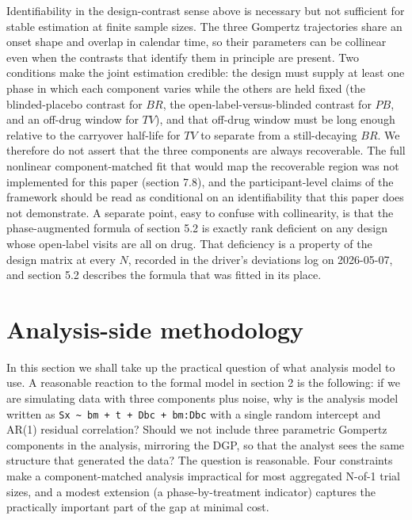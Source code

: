 \documentclass[
  11pt,
]{article}
\begin{document}
Identifiability in the design-contrast sense above is necessary but not
sufficient for stable estimation at finite sample sizes. The three Gompertz
trajectories share an onset shape and overlap in calendar time, so their
parameters can be collinear even when the contrasts that identify them in
principle are present. Two conditions make the joint estimation credible: the
design must supply at least one phase in which each component varies while the
others are held fixed (the blinded-placebo contrast for \(BR\), the
open-label-versus-blinded contrast for \(PB\), and an off-drug window for \(TV\)),
and that off-drug window must be long enough relative to the carryover
half-life for \(TV\) to separate from a still-decaying \(BR\). We therefore do
not assert that the three components are always recoverable. The full
nonlinear component-matched fit that would map the recoverable region was
not implemented for this paper (section 7.8), and the participant-level
claims of the framework should be read as conditional on an
identifiability that this paper does not demonstrate. A separate point,
easy to confuse with collinearity, is that the phase-augmented formula of
section 5.2 is exactly rank deficient on any design whose open-label
visits are all on drug. That deficiency is a property of the design
matrix at every \(N\), recorded in the driver's deviations log on
2026-05-07, and section 5.2 describes the formula that was fitted in its
place.

\section{Analysis-side methodology}\label{analysis-side-methodology}

In this section we shall take up the practical question of what analysis model
to use. A reasonable reaction to the formal model in section 2 is the
following: if we are simulating data with three components plus noise, why is
the analysis model written as \texttt{Sx \textasciitilde\ bm + t + Dbc +
bm:Dbc} with a single random intercept and AR(1) residual correlation? Should
we not include three parametric Gompertz components in the analysis, mirroring
the DGP, so that the analyst sees the same structure that generated the data?
The question is reasonable. Four constraints make a component-matched analysis
impractical for most aggregated N-of-1 trial sizes, and a modest extension (a
phase-by-treatment indicator) captures the practically important part of the
gap at minimal cost.
\end{document}
